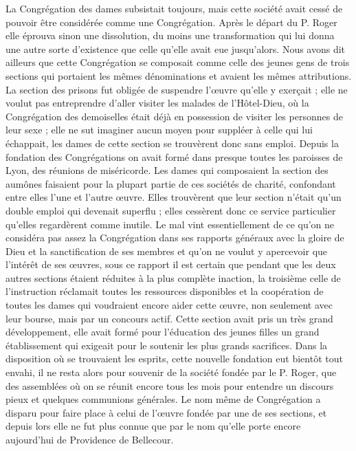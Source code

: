 La Congrégation des dames subsistait toujours, mais cette société avait cessé de pouvoir être considérée comme une Congrégation. Après le départ du P. Roger elle éprouva sinon une dissolution, du moins une transformation qui lui donna une autre sorte d'existence que celle qu'elle avait eue jusqu'alors. Nous avons dit ailleurs que cette Congrégation se composait comme celle des jeunes gens de trois sections qui portaient les mêmes dénominations et avaient les mêmes attributions. La section des prisons fut obligée de suspendre l'œuvre qu'elle y exerçait ; elle ne voulut pas entreprendre d'aller visiter les malades de l'Hôtel-Dieu, où la Congrégation des demoiselles était déjà en possession de visiter les personnes de leur sexe ; elle ne sut imaginer aucun moyen pour suppléer à celle qui lui échappait, les dames de cette section se trouvèrent donc sans emploi. Depuis la fondation des Congrégations on avait formé dans presque toutes les paroisses de Lyon, des réunions de miséricorde. Les dames qui composaient la section des aumônes faisaient pour la plupart partie de ces sociétés de charité, confondant entre elles l'une et l'autre œuvre. Elles trouvèrent que leur section n'était qu'un double emploi qui devenait superflu ; elles cessèrent donc ce service particulier qu'elles regardèrent comme inutile. Le mal vint essentiellement de ce qu'on ne considéra
pas assez la Congrégation dans ses rapports généraux avec la gloire de Dieu et la sanctification de ses membres et qu'on ne voulut y apercevoir que l'intérêt de ses œuvres, sous ce rapport il est certain que pendant que les deux autres sections étaient réduites à la plus complète inaction, la troisième celle de l'instruction réclamait toutes les ressources disponibles et la coopération de toutes les dames qui voudraient encore aider cette œuvre, non seulement avec leur bourse, mais par un concours actif. Cette section avait pris un très grand développement, elle avait formé pour l'éducation des jeunes filles un grand établissement qui exigeait pour le soutenir les plus grands sacrifices. Dans la disposition où se trouvaient les esprits, cette nouvelle fondation eut bientôt tout envahi, il ne resta alors pour souvenir de la société fondée par le P. Roger, que des assemblées où on se réunit encore tous les mois pour entendre un discours pieux et quelques communions générales. Le nom même de Congrégation a disparu pour faire place à celui de l'œuvre fondée par une de ses sections, et depuis lors elle ne fut plus connue que par le nom qu'elle porte encore aujourd'hui de Providence de Bellecour.

